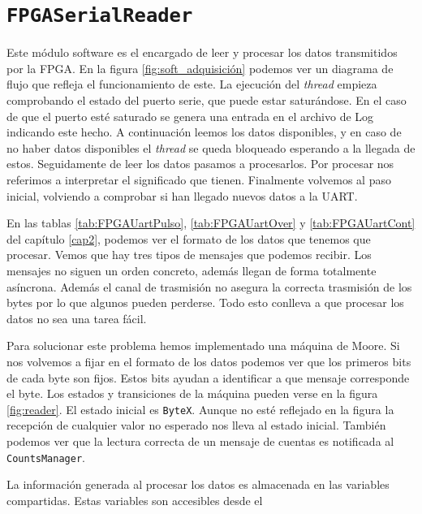     \section{\texttt{FPGASerialReader}}
        Este módulo software es el encargado de leer y procesar los datos
        transmitidos por la FPGA. En la figura \ref{fig:soft_adquisición}
        podemos ver un diagrama de flujo que refleja el funcionamiento de este.
        La ejecución del \emph{thread} empieza comprobando el estado del puerto
        serie, que puede estar saturándose. En el caso de que el puerto esté
        saturado se genera una entrada en el archivo de Log indicando este
        hecho. A continuación leemos los datos disponibles, y en caso de no
        haber datos disponibles el \emph{thread} se queda bloqueado esperando a
        la llegada de estos. Seguidamente de leer los datos pasamos a
        procesarlos. Por procesar nos referimos a interpretar el significado
        que tienen. Finalmente volvemos al paso inicial, volviendo a comprobar
        si han llegado nuevos datos a la UART.
        \par
        En las tablas \ref{tab:FPGAUartPulso}, \ref{tab:FPGAUartOver} y
        \ref{tab:FPGAUartCont}  del capítulo \ref{cap2}, podemos ver el
        formato de los datos que tenemos que procesar. Vemos que hay tres tipos
        de mensajes que podemos recibir. Los mensajes no siguen un orden
        concreto, además llegan de forma totalmente asíncrona. Además el canal
        de trasmisión no asegura la correcta trasmisión de los bytes por lo que
        algunos pueden perderse. Todo esto conlleva a que procesar los datos no
        sea una tarea fácil.
        \par
        Para solucionar este problema hemos implementado una máquina de Moore.
        Si nos volvemos a fijar en el formato de los datos podemos ver que los
        primeros bits de cada byte son fijos. Estos bits ayudan a identificar a
        que mensaje corresponde el byte. Los estados y transiciones de la
        máquina pueden verse en la figura \ref{fig:reader}. El estado inicial
        es \texttt{ByteX}. Aunque no esté reflejado en la figura la recepción
        de cualquier valor no esperado nos lleva al estado inicial. También
        podemos ver que la lectura correcta de un mensaje de cuentas es
        notificada al \texttt{CountsManager}.
        \par
        La información generada al procesar los datos es almacenada en las
        variables compartidas. Estas variables son accesibles desde el
